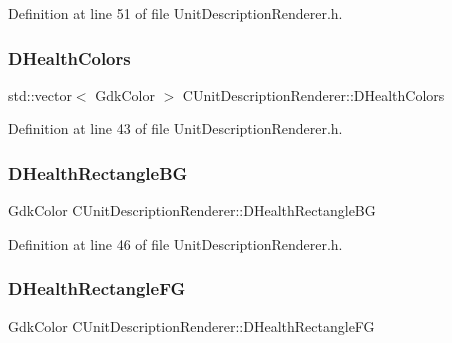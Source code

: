 Definition at line 51 of file Unit\+Description\+Renderer.\+h.

\hypertarget{classCUnitDescriptionRenderer_afa1e3591f74862f7640695f0f6125bc7}{}\label{classCUnitDescriptionRenderer_afa1e3591f74862f7640695f0f6125bc7} 
\subsubsection{\texorpdfstring{D\+Health\+Colors}{DHealthColors}}
{\footnotesize\ttfamily std\+::vector$<$ Gdk\+Color $>$ C\+Unit\+Description\+Renderer\+::\+D\+Health\+Colors\hspace{0.3cm}{\ttfamily [protected]}}



Definition at line 43 of file Unit\+Description\+Renderer.\+h.

\hypertarget{classCUnitDescriptionRenderer_ac3f81e657b619785c3babd9026b7c6d2}{}\label{classCUnitDescriptionRenderer_ac3f81e657b619785c3babd9026b7c6d2} 
\subsubsection{\texorpdfstring{D\+Health\+Rectangle\+BG}{DHealthRectangleBG}}
{\footnotesize\ttfamily Gdk\+Color C\+Unit\+Description\+Renderer\+::\+D\+Health\+Rectangle\+BG\hspace{0.3cm}{\ttfamily [protected]}}



Definition at line 46 of file Unit\+Description\+Renderer.\+h.

\hypertarget{classCUnitDescriptionRenderer_a0853b06022be60337a5015efb90666bd}{}\label{classCUnitDescriptionRenderer_a0853b06022be60337a5015efb90666bd} 
\subsubsection{\texorpdfstring{D\+Health\+Rectangle\+FG}{DHealthRectangleFG}}
{\footnotesize\ttfamily Gdk\+Color C\+Unit\+Description\+Renderer\+::\+D\+Health\+Rectangle\+FG\hspace{0.3cm}{\ttfamily [protected]}}



